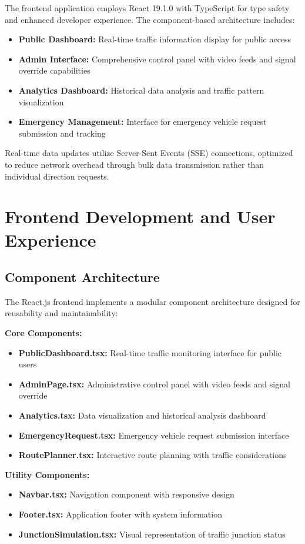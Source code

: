 \documentclass[conference]{IEEEtran}
\begin{document}
The frontend application employs React 19.1.0 with TypeScript for type safety and enhanced developer experience. The component-based architecture includes:

\begin{itemize}
\item \textbf{Public Dashboard:} Real-time traffic information display for public access
\item \textbf{Admin Interface:} Comprehensive control panel with video feeds and signal override capabilities
\item \textbf{Analytics Dashboard:} Historical data analysis and traffic pattern visualization
\item \textbf{Emergency Management:} Interface for emergency vehicle request submission and tracking
\end{itemize}

Real-time data updates utilize Server-Sent Events (SSE) connections, optimized to reduce network overhead through bulk data transmission rather than individual direction requests.

\section{Frontend Development and User Experience}

\subsection{Component Architecture}

The React.js frontend implements a modular component architecture designed for reusability and maintainability:

\textbf{Core Components:}
\begin{itemize}
\item \textbf{PublicDashboard.tsx:} Real-time traffic monitoring interface for public users
\item \textbf{AdminPage.tsx:} Administrative control panel with video feeds and signal override
\item \textbf{Analytics.tsx:} Data visualization and historical analysis dashboard
\item \textbf{EmergencyRequest.tsx:} Emergency vehicle request submission interface
\item \textbf{RoutePlanner.tsx:} Interactive route planning with traffic considerations
\end{itemize}

\textbf{Utility Components:}
\begin{itemize}
\item \textbf{Navbar.tsx:} Navigation component with responsive design
\item \textbf{Footer.tsx:} Application footer with system information
\item \textbf{JunctionSimulation.tsx:} Visual representation of traffic junction status
\end{itemize}
\end{document}
